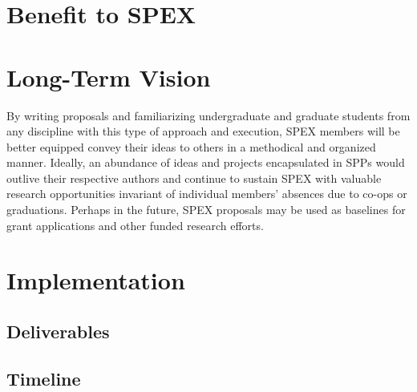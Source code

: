 \documentclass[journal]{SPEXformat}
\begin{document}
\section{Benefit to SPEX}
\label{sec:benefit}

\section{Long-Term Vision}
\label{sec:vision}
By writing proposals and familiarizing undergraduate and graduate students from any discipline with this type of approach and execution, SPEX members will be better equipped convey their ideas to others in a methodical and organized manner.
Ideally, an abundance of ideas and projects encapsulated in SPPs would outlive their respective authors and continue to sustain SPEX with valuable research opportunities invariant of individual members' absences due to co-ops or graduations.
Perhaps in the future, SPEX proposals may be used as baselines for grant applications and other funded research efforts.

\section{Implementation}
\label{sec:implementation}
\subsection{Deliverables}
\label{subsec:deliverables}
\subsection{Timeline}
\label{subsec:timeline}


\end{document}
